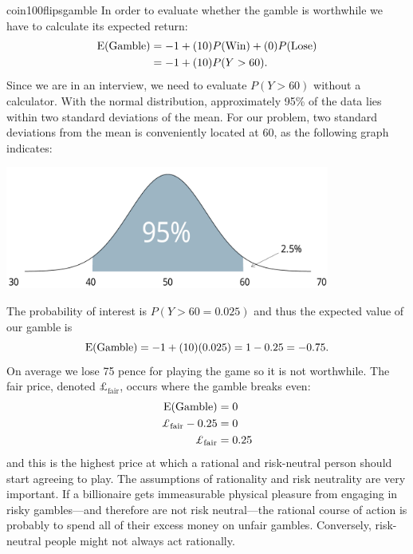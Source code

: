 \begin{answer}{coin100flipsgamble}
In order to evaluate whether the gamble is worthwhile we have to calculate its expected return:
\begin{align*}
  \operatorname{\mathrm{E}}(\text{Gamble}) &= -1 + (10)P(\text{Win})  + (0)P(\text{Lose}) \\
                    &= -1 + (10)P(Y>60)
                    \text{.}
\end{align*}
Since we are in an interview, we need to evaluate $P(Y>60)$ without a calculator.
With the normal distribution, approximately 95\% of the data lies within two standard deviations of the mean.
For our problem, two standard deviations from the mean is conveniently located at 60, as the following graph indicates:
\begin{center}
  \includegraphics[width=0.8\textwidth]{./plots/prettynorm/prettynorm.pdf}
\end{center}
The probability of interest is $P(Y>60 = 0.025)$ and thus the expected value of our gamble is
\[
  \operatorname{\mathrm{E}}(\text{Gamble}) = -1 + (10)(0.025) = 1 - 0.25 = -0.75
  \text{.}
\]
On average we lose 75 pence for playing the game so it is not worthwhile.
The fair price, denoted $\pounds_{\text{fair}}$, occurs where the gamble breaks even:
\begin{align*}
  \E(\text{Gamble})     &=  0    \\
  \pounds_{\text{fair}} - 0.25 &=  0    \\
  \pounds_{\text{fair}}        &=  0.25
\end{align*}
and this is the highest price at which a
rational and risk-neutral person should start agreeing to play.
The assumptions of rationality and risk neutrality are very important.
If a billionaire gets immeasurable physical pleasure from engaging in risky gambles---and therefore are not risk neutral---the rational course of action is probably to spend all of their excess money on unfair gambles.
Conversely, risk-neutral people might not always act rationally.

\end{answer}
